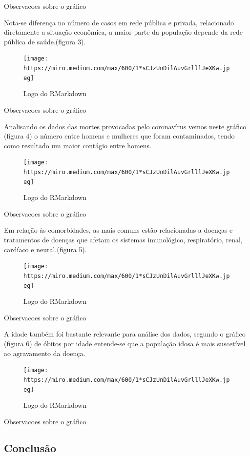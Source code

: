 \documentclass[
]{article}
\begin{document}
Observacoes sobre o gráfico

Nota-se diferença no número de casos em rede pública e privada,
relacionado diretamente a situação econômica, a maior parte da população
depende da rede pública de saúde.(figura 3).

\begin{figure}
\centering
\texttt{[image: https://miro.medium.com/max/600/1*sCJzUnDilAuvGrlllJeXKw.jpeg]}
\caption{Logo do RMarkdown}
\end{figure}

Observacoes sobre o gráfico

Analisando os dados das mortes provocadas pelo coronavírus vemos neste
gráfico (figura 4) o número entre homens e mulheres que foram
contaminados, tendo como resultado um maior contágio entre homens.

\begin{figure}
\centering
\texttt{[image: https://miro.medium.com/max/600/1*sCJzUnDilAuvGrlllJeXKw.jpeg]}
\caption{Logo do RMarkdown}
\end{figure}

Observacoes sobre o gráfico

Em relação às comorbidades, as mais comuns estão relacionadas a doenças
e tratamentos de doenças que afetam os sistemas imunológico,
respiratório, renal, cardíaco e neural.(figura 5).

\begin{figure}
\centering
\texttt{[image: https://miro.medium.com/max/600/1*sCJzUnDilAuvGrlllJeXKw.jpeg]}
\caption{Logo do RMarkdown}
\end{figure}

Observacoes sobre o gráfico

A idade também foi bastante relevante para análise dos dados, segundo o
gráfico (figura 6) de óbitos por idade entende-se que a população idosa
é mais suscetível ao agravamento da doença.

\begin{figure}
\centering
\texttt{[image: https://miro.medium.com/max/600/1*sCJzUnDilAuvGrlllJeXKw.jpeg]}
\caption{Logo do RMarkdown}
\end{figure}

Observacoes sobre o gráfico

\hypertarget{conclusuxe3o}{%
\subsection{Conclusão}\label{conclusuxe3o}}
\end{document}
